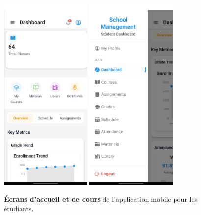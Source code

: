 \begin{figure}[H]
  \centering
  \includegraphics[width=0.4\textwidth,keepaspectratio]{pfe-pics/Mobile /Students/Screenshot_20250610_130022_Expo Go.jpg}
  \includegraphics[width=0.4\textwidth,keepaspectratio]{pfe-pics/Mobile /Students/Screenshot_20250610_130124_Expo Go.jpg}
  \caption{\textbf{Écrans d'accueil et de cours} de l'application mobile pour les étudiants.}
  \label{fig:mobile_student_home}
\end{figure}

